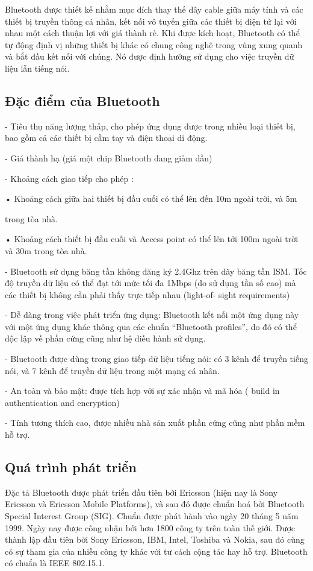 Bluetooth được thiết kế nhằm mục đích thay thế dây cable giữa máy tính và các thiết bị truyền thông cá nhân, kết nối vô tuyến giữa các thiết bị điện tử lại với nhau một cách thuận lợi với giá thành rẻ. Khi được kích hoạt, Bluetooth có thể tự động định vị những thiết bị khác có chung công nghệ trong vùng xung quanh và bắt đầu kết nối với chúng. Nó được định hướng sử dụng cho việc truyền dữ liệu lẫn tiếng nói.

\subsection{Đặc điểm của Bluetooth}
- Tiêu thụ năng lượng thấp, cho phép ứng dụng được trong nhiều loại thiết bị, bao gồm cả các thiết bị cầm tay và điện thoại di động.

- Giá thành hạ (giá một chip Bluetooth đang giảm dần)

- Khoảng cách giao tiếp cho phép :

• Khoảng cách giữa hai thiết bị đầu cuối có thể lên đến 10m ngoài trời, và 5m

trong tòa nhà.

• Khoảng cách thiết bị đầu cuối và Access point có thể lên tới 100m ngoài trời và 30m trong tòa nhà.

- Bluetooth sử dụng băng tần không đăng ký 2.4Ghz trên dãy băng tần ISM. Tốc độ truyền dữ liệu có thể đạt tới mức tối đa 1Mbps (do sử dụng tần số cao) mà các thiết bị không cần phải thấy trực tiếp nhau (light-of- sight requirements)

- Dễ dàng trong việc phát triển ứng dụng: Bluetooth kết nối một ứng dụng này với một ứng dụng khác thông qua các chuẩn “Bluetooth profiles”, do đó có thể độc lập về phần cứng cũng như hệ điều hành sử dụng.

- Bluetooth được dùng trong giao tiếp dữ liệu tiếng nói: có 3 kênh để truyền tiếng nói, và 7 kênh để truyền dữ liệu trong một mạng cá nhân.

- An toàn và bảo mật: được tích hợp với sự xác nhận và mã hóa ( build in authentication and encryption)

- Tính tương thích cao, được nhiều nhà sản xuất phần cứng cũng như phần mềm hỗ trợ.

\subsection{Quá trình phát triển}
\label{history}
Đặc tả Bluetooth được phát triển đầu tiên bởi Ericsson (hiện nay là Sony Ericsson và Ericsson Mobile Platforms), và sau đó được chuẩn hoá bởi Bluetooth Special Interest Group (SIG). Chuẩn được phát hành vào ngày 20 tháng 5 năm 1999. Ngày nay được công nhận bởi hơn 1800 công ty trên toàn thế giới. Được thành lập đầu tiên bởi Sony Ericsson, IBM, Intel, Toshiba và Nokia, sau đó cùng có sự tham gia của nhiều công ty khác với tư cách cộng tác hay hỗ trợ. Bluetooth có chuẩn là IEEE 802.15.1.


